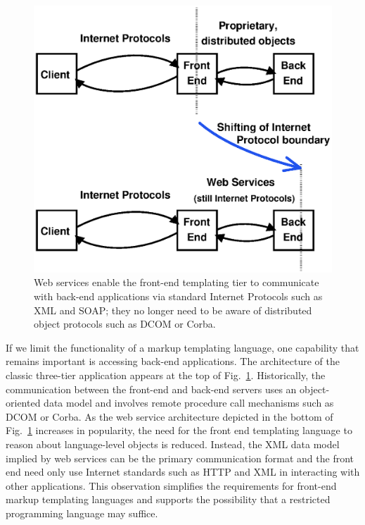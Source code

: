 \documentclass{www2003-submission}
\newcommand{\figref}[1]{Fig.~\ref{fig-#1}}
\begin{document}
\begin{figure}[bt]
\begin{centering}
\includegraphics[width=1\linewidth]{web-service-ip-shift.eps}
\caption{Web services enable the front-end templating tier to
communicate with back-end applications via standard Internet Protocols
such as XML and SOAP; they no longer need to be aware of distributed
object protocols such as DCOM or Corba.\label{fig-ws-ip-shift}}
\end{centering}
\end{figure}

If we limit the functionality of a markup templating language, one
capability that remains important is accessing back-end applications.
The architecture of the classic three-tier application appears at the
top of \figref{ws-ip-shift}.  Historically, the communication between
the front-end and back-end servers uses an object-oriented data model
and involves remote procedure call mechanisms such as DCOM or Corba.
As the web service architecture depicted in the bottom of
\figref{ws-ip-shift} increases in popularity, the need for the front
end templating language to reason about language-level objects is
reduced.  Instead, the XML data model implied by web services can be
the primary communication format and the front end need only use
Internet standards such as HTTP and XML in interacting with other
applications.  This observation simplifies the requirements
for front-end markup templating languages and supports the possibility
that a restricted programming language may suffice.
\end{document}
